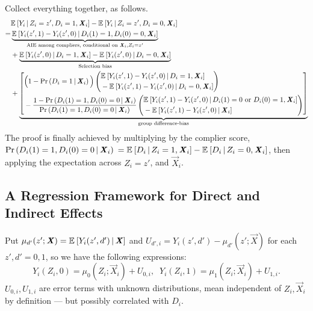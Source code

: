 Collect everything together, as follows.
\begin{align*}
    &  \mathbb{E}_{} \left[ Y_i \, \middle\vert \, Z_i = z', D_i = 1, \boldsymbol{\mathit{X}}_i \right]
    - \mathbb{E}_{} \left[ Y_i \, \middle\vert \, Z_i = z', D_i = 0, \boldsymbol{\mathit{X}}_i \right] \\
    =& \underbrace{
        \mathbb{E}_{} \left[ Y_i(z', 1) - Y_i(z', 0) \, \middle\vert \, D_i(1) =1, D_i(0)=0,\boldsymbol{\mathit{X}}_i \right]}_{
            \text{AIE among compliers, conditional on }\boldsymbol{\mathit{X}}_i, Z_i = z'} \\
    &+ \underbrace{
        \mathbb{E}_{} \left[ Y_i(z', 0) \, \middle\vert \, D_i = 1, \boldsymbol{\mathit{X}}_i \right]
            - \mathbb{E}_{} \left[ Y_i(z', 0) \, \middle\vert \, D_i = 0, \boldsymbol{\mathit{X}}_i \right]}_{
                \text{Selection bias}} \\
    &+ \underbrace{\left[ \begin{aligned}
        &\Big( 1 - \Pr\left( D_i = 1 \, \middle\vert \, \boldsymbol{\mathit{X}}_i \right) \Big)
        \left( \begin{aligned}
            &\mathbb{E}_{} \left[ Y_i(z', 1) - Y_i(z', 0) \, \middle\vert \, D_i = 1, \boldsymbol{\mathit{X}}_i \right] \\ 
            &  - \mathbb{E}_{} \left[ Y_i(z', 1) - Y_i(z', 0) \, \middle\vert \, D_i = 0, \boldsymbol{\mathit{X}}_i \right]
        \end{aligned} \right) \\
        &- \frac{1 - \Pr\left( D_i(1) = 1, D_i(0) = 0 \, \middle\vert \, \boldsymbol{\mathit{X}}_i \right) }{
            \Pr\left( D_i(1) = 1, D_i(0) = 0 \, \middle\vert \, \boldsymbol{\mathit{X}}_i \right)} 
        \left( \begin{aligned}
            &\mathbb{E}_{} \left[ Y_i(z', 1) - Y_i(z', 0) \, \middle\vert \, D_i(1) = 0 \text{ or } D_i(0)=1, \boldsymbol{\mathit{X}}_i \right] \\ 
            &  - \mathbb{E}_{} \left[ Y_i(z', 1) - Y_i(z', 0) \, \middle\vert \, \boldsymbol{\mathit{X}}_i \right]
        \end{aligned} \right)
    \end{aligned} \right] }_{
        \text{group difference-bias}}
\end{align*}
The proof is finally achieved by multiplying by the complier score, 
$\Pr\left( D_i(1) = 1, D_i(0) = 0 \, \middle\vert \, \boldsymbol{\mathit{X}}_i \right)$
$= \mathbb{E}_{} \left[ D_i \, \middle\vert \, Z_i = 1, \boldsymbol{\mathit{X}}_i \right] - \mathbb{E}_{} \left[ D_i \, \middle\vert \, Z_i = 0, \boldsymbol{\mathit{X}}_i \right]$,
then applying the expectation across $Z_i = z'$, and $\vec X_i$.

\subsection{A Regression Framework for Direct and Indirect Effects}
\label{appendix:regression-model}
Put $\mu_{d'}(z'; \boldsymbol{\mathit{X}}) = \mathbb{E}_{} \left[ Y_i(z', d') \, \middle\vert \, \boldsymbol{\mathit{X}} \right]$ and $U_{d', i} = Y_i(z', d') - \mu_{d'}(z'; \vec X)$ for each $z',d'=0,1$, so we have the following expressions:
\[ Y_i(Z_i, 0)
        = \mu_{0}(Z_i; \vec X_i) + U_{0,i}, \;\;
    Y_i(Z_i, 1)
        = \mu_{1}(Z_i; \vec X_i) + U_{1,i}. \]
$U_{0,i}, U_{1,i}$ are error terms with unknown distributions, mean independent of $Z_i, \vec X_i$ by definition --- but possibly correlated with $D_i$.


